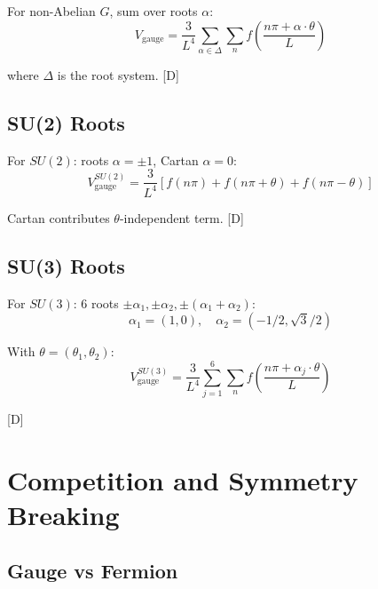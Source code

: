 \documentclass[11pt,a4paper]{article}
\newcommand{\tagD}{\textcolor{blue!70!black}{[D]}}
\begin{document}
For non-Abelian $G$, sum over roots $\alpha$:
\begin{equation}
\label{eq:gauge-roots}
V_{\text{gauge}} = \frac{3}{L^4} \sum_{\alpha \in \Delta} \sum_n f\left(\frac{n\pi + \alpha\cdot\theta}{L}\right)
\end{equation}

where $\Delta$ is the root system. \tagD

\subsection{SU(2) Roots}

For $SU(2)$: roots $\alpha = \pm 1$, Cartan $\alpha = 0$:
\begin{equation}
\label{eq:su2-gauge-v}
V_{\text{gauge}}^{SU(2)} = \frac{3}{L^4} \left[f(n\pi) + f(n\pi + \theta) + f(n\pi - \theta)\right]
\end{equation}

Cartan contributes $\theta$-independent term. \tagD

\subsection{SU(3) Roots}

For $SU(3)$: 6 roots $\pm\alpha_1, \pm\alpha_2, \pm(\alpha_1+\alpha_2)$:
\begin{equation}
\label{eq:su3-roots}
\alpha_1 = (1, 0), \quad \alpha_2 = (-1/2, \sqrt{3}/2)
\end{equation}

With $\theta = (\theta_1, \theta_2)$:
\begin{equation}
\label{eq:su3-gauge-v}
V_{\text{gauge}}^{SU(3)} = \frac{3}{L^4} \sum_{j=1}^6 \sum_n f\left(\frac{n\pi + \alpha_j\cdot\theta}{L}\right)
\end{equation}

\tagD

\section{Competition and Symmetry Breaking}

\subsection{Gauge vs Fermion}
\end{document}
